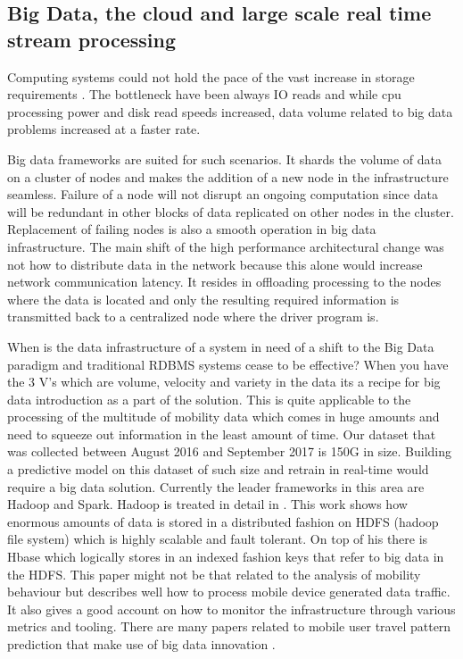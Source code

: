 \documentclass[12pt, a4paper]{report}
\theoremstyle{definition}
\theoremstyle{definition}%
\theoremstyle{definition}%
\theoremstyle{definition}%
\theoremstyle{definition}%
\theoremstyle{definition}%
\begin{document}
\subsection{Big Data, the cloud and large scale real time stream processing} \label{background_big_data}

Computing systems could not hold the pace of the vast increase in storage requirements \cite{Liu2014}. The bottleneck have been always IO reads and while cpu processing power and disk read speeds increased, data volume related to big data problems increased at a faster rate. 

Big data frameworks are suited for such scenarios. It shards the volume of data on a cluster of nodes and makes the addition of a new node in the infrastructure seamless. Failure of a node will not disrupt an ongoing computation since data will be redundant in other blocks of data replicated on other nodes in the cluster. Replacement of failing nodes is also a smooth operation in big data infrastructure. The main shift of the high performance architectural change was not how to distribute data in the network because this alone would increase network communication latency. It resides in offloading processing to the nodes where the data is located and only the resulting required information is transmitted back to a centralized node where the driver program is.

When is the data infrastructure of a system in need of a shift to the Big Data paradigm and traditional RDBMS systems cease to be effective? When you have the 3 V's which are volume, velocity and variety in the data its a recipe for big data introduction as a part of the solution. This is quite applicable to the processing of the multitude of mobility data which comes in huge amounts and need to squeeze out information in the least amount of time. Our dataset that was collected between August 2016 and September 2017 is 150G in size. Building a predictive model on this dataset of such size and retrain in real-time would require a big data solution. Currently the leader frameworks in this area are Hadoop and Spark. Hadoop is treated in detail in \cite{Liu2014}. This work shows how enormous amounts of data is stored in a distributed fashion on HDFS (hadoop file system) which is highly scalable and fault tolerant. On top of his there is Hbase which logically stores in an indexed fashion keys that refer to big data in the HDFS. This paper \cite{Liu2014} might not be that related to the analysis of mobility behaviour but describes well how to process mobile device generated data traffic. It also gives a good account on how to monitor the infrastructure through various metrics and tooling. There are many papers related to mobile user travel pattern prediction that make use of big data innovation  \cite{Liu2014,Laurila2012,Kurien2012}.  
\end{document}
